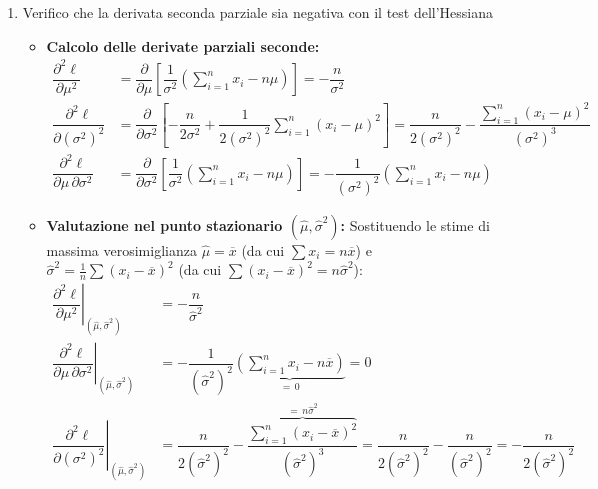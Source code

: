 \documentclass{article}  %
\theoremstyle{definition}
\begin{document}
\begin{esempio}
\begin{enumerate}
\begin{enumerate}
		      \end{enumerate}
		\item Verifico che la derivata seconda parziale sia negativa con il test dell'Hessiana
		      \begin{itemize}
			      \item \textbf{Calcolo delle derivate parziali seconde:}
			            \begin{align*}
				            \dfrac{\partial^2 \ell}{\partial \mu^2}                    & = \dfrac{\partial}{\partial \mu} \left[ \dfrac{1}{\sigma^2} \left( \sum_{i=1}^n x_i - n\mu \right) \right] = -\dfrac{n}{\sigma^2}                                                                              \\[10pt]
				            \dfrac{\partial^2 \ell}{\partial (\sigma^2)^2}             & = \dfrac{\partial}{\partial \sigma^2} \left[ -\dfrac{n}{2\sigma^2} + \dfrac{1}{2(\sigma^2)^2} \sum_{i=1}^n (x_i - \mu)^2 \right] = \dfrac{n}{2(\sigma^2)^2} - \dfrac{\sum_{i=1}^n (x_i - \mu)^2}{(\sigma^2)^3} \\[10pt]
				            \dfrac{\partial^2 \ell}{\partial \mu \, \partial \sigma^2} & = \dfrac{\partial}{\partial \sigma^2} \left[ \dfrac{1}{\sigma^2} \left( \sum_{i=1}^n x_i - n\mu \right) \right] = -\dfrac{1}{(\sigma^2)^2} \left( \sum_{i=1}^n x_i - n\mu \right)
			            \end{align*}

			      \item \textbf{Valutazione nel punto stazionario $(\hat{\mu}, \hat{\sigma}^2)$:}
			            Sostituendo le stime di massima verosimiglianza $\hat{\mu} = \overline{x}$ (da cui $\sum x_i = n\overline{x}$) e $\hat{\sigma}^2 = \frac{1}{n}\sum(x_i-\overline{x})^2$ (da cui $\sum(x_i-\overline{x})^2 = n\hat{\sigma}^2$):
			            \begin{align*}
				            \left. \dfrac{\partial^2 \ell}{\partial \mu^2} \right|_{(\hat{\mu}, \hat{\sigma}^2)}                    & = -\dfrac{n}{\hat{\sigma}^2}                                                                                                                                                                                                             \\[10pt]
				            \left. \dfrac{\partial^2 \ell}{\partial \mu \, \partial \sigma^2} \right|_{(\hat{\mu}, \hat{\sigma}^2)} & = -\dfrac{1}{(\hat{\sigma}^2)^2} \underbrace{\left( \sum_{i=1}^n x_i - n\overline{x} \right)}_{= \, 0} = 0                                                                                                                               \\[10pt]
				            \left. \dfrac{\partial^2 \ell}{\partial (\sigma^2)^2} \right|_{(\hat{\mu}, \hat{\sigma}^2)}             & = \dfrac{n}{2(\hat{\sigma}^2)^2} - \dfrac{\overbrace{\sum_{i=1}^n (x_i - \overline{x})^2}^{= \, n\hat{\sigma}^2}}{(\hat{\sigma}^2)^3} = \dfrac{n}{2(\hat{\sigma}^2)^2} - \dfrac{n}{(\hat{\sigma}^2)^2} = -\dfrac{n}{2(\hat{\sigma}^2)^2}
			            \end{align*}


\end{itemize}
\end{enumerate}
\end{esempio}
\end{document}
